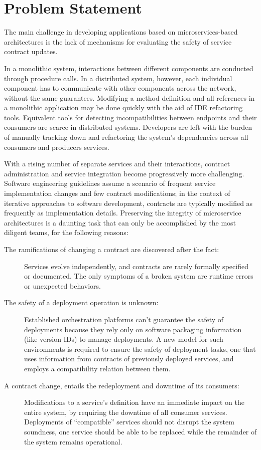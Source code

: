 \section{Problem Statement} %
\label{sec:problem_statement}

The main challenge in developing applications based on microservices-based architectures is the lack of mechanisms for evaluating the safety of service contract updates.

In a monolithic system, interactions between different components are conducted through procedure calls.
In a distributed system, however, each individual component has to communicate with other components across the network,
without the same guarantees.
Modifying a method definition and all references in a monolithic application may be done quickly with the aid of IDE refactoring tools.
Equivalent tools for detecting incompatibilities between endpoints and their consumers are scarce in distributed systems.
Developers are left with the burden of manually tracking down and refactoring the system's dependencies across all consumers and producers services.

With a rising number of separate services and their interactions, contract administration and service integration become progressively more challenging.
Software engineering guidelines assume a scenario of frequent service implementation changes and few contract modifications;
in the context of iterative approaches to software development, contracts are typically modified as frequently as implementation details.
Preserving the integrity of microservice architectures is a daunting task that can only be accomplished by the most diligent teams, for the following reasons:

\begin{description}
    \item [The ramifications of changing a contract are discovered after the fact:] Services evolve independently, and contracts are rarely formally specified or documented.
    The only symptoms of a broken system are runtime errors or unexpected behaviors.
    \item[The safety of a deployment operation is unknown:] Established orchestration platforms can't guarantee the safety of deployments because they rely only on software packaging information (like version IDs) to manage deployments.
    A new model for such environments is required to ensure the safety of deployment tasks, one that uses information from contracts of previously deployed services,
    and employs a compatibility relation between them.
    \item[A contract change, entails the redeployment and downtime of its consumers:] Modifications to a service's definition have an immediate impact on the entire system, by requiring the downtime of all consumer services.
    Deployments of “compatible” services should not disrupt the system soundness,
    one service should be able to be replaced while the remainder of the system remains operational.
\end{description}

